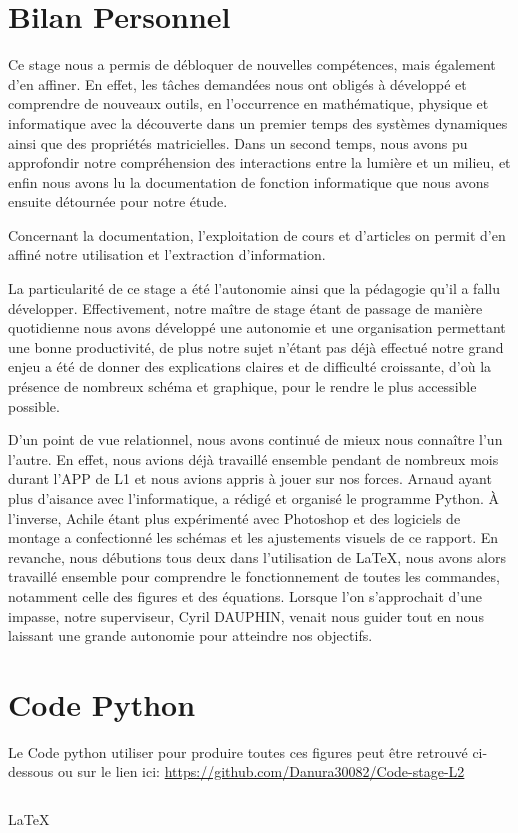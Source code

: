\documentclass[12pt]{article}
\begin{document}
\newpage


\appendix
\section{Bilan Personnel}
Ce stage nous a permis de débloquer de nouvelles compétences, mais également d’en affiner. En effet,
les tâches demandées nous ont obligés à développé et comprendre de nouveaux outils, en l’occurrence en mathématique, physique et informatique avec la découverte dans un premier temps des systèmes dynamiques ainsi que des propriétés matricielles. Dans un second temps, nous avons pu approfondir notre compréhension des interactions entre la lumière et un milieu, et enfin nous avons lu la documentation de fonction informatique que nous avons ensuite détournée pour notre étude.\par
Concernant la documentation, l'exploitation de cours et d'articles on permit d'en affiné notre utilisation et l’extraction d'information.\par
La particularité de ce stage a été l'autonomie ainsi que la pédagogie qu'il a fallu développer. Effectivement, notre maître de stage étant de passage de manière quotidienne nous avons développé une autonomie et une organisation permettant une bonne productivité, de plus notre sujet n'étant pas déjà effectué notre grand enjeu a été de donner des explications claires et de difficulté croissante, d'où la présence de nombreux schéma et graphique, pour le rendre le plus accessible possible.\par
D’un point de vue relationnel, nous avons continué de mieux nous connaître l’un l’autre. En effet, nous avions déjà travaillé ensemble pendant de nombreux mois durant l’APP de L1 et nous avions appris à jouer sur nos forces. Arnaud ayant plus d’aisance avec l’informatique, a rédigé et organisé le programme Python. À l’inverse, Achile étant plus expérimenté avec Photoshop et des logiciels de montage a confectionné les schémas et les ajustements visuels de ce rapport. En revanche, nous débutions tous deux dans l’utilisation de LaTeX, nous avons alors travaillé ensemble pour comprendre le fonctionnement de toutes les commandes, notamment celle des figures et des équations. Lorsque l’on s’approchait d’une impasse, notre superviseur, Cyril DAUPHIN,
venait nous guider tout en nous laissant une grande autonomie pour atteindre nos objectifs. 
\section{Code Python}
Le Code python utiliser pour produire toutes ces figures peut être retrouvé ci-dessous ou sur le lien ici: \url{https://github.com/Danura30082/Code-stage-L2}
\inputminted[baselinestretch=1.2,
fontsize=\footnotesize,
linenos, breaklines]{Python}{V8.py}


\LaTeX
\end{document}
